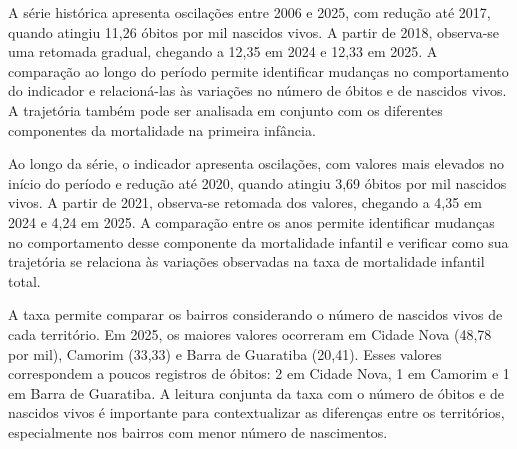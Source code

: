 A série histórica apresenta oscilações entre 2006 e 2025, com redução até 2017, quando atingiu 11,26 óbitos por mil nascidos vivos. A partir de 2018, observa-se uma retomada gradual, chegando a 12,35 em 2024 e 12,33 em 2025. A comparação ao longo do período permite identificar mudanças no comportamento do indicador e relacioná-las às variações no número de óbitos e de nascidos vivos. A trajetória também pode ser analisada em conjunto com os diferentes componentes da mortalidade na primeira infância.


Ao longo da série, o indicador apresenta oscilações, com valores mais elevados no início do período e redução até 2020, quando atingiu 3,69 óbitos por mil nascidos vivos. A partir de 2021, observa-se retomada dos valores, chegando a 4,35 em 2024 e 4,24 em 2025. A comparação entre os anos permite identificar mudanças no comportamento desse componente da mortalidade infantil e verificar como sua trajetória se relaciona às variações observadas na taxa de mortalidade infantil total.


A taxa permite comparar os bairros considerando o número de nascidos vivos de cada território. Em 2025, os maiores valores ocorreram em Cidade Nova (48,78 por mil), Camorim (33,33) e Barra de Guaratiba (20,41). Esses valores correspondem a poucos registros de óbitos: 2 em Cidade Nova, 1 em Camorim e 1 em Barra de Guaratiba. A leitura conjunta da taxa com o número de óbitos e de nascidos vivos é importante para contextualizar as diferenças entre os territórios, especialmente nos bairros com menor número de nascimentos.


